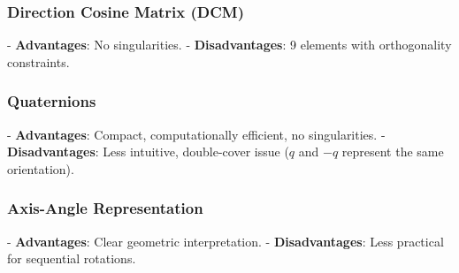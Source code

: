 \documentclass{article}
\begin{document}
\subsubsection{Direction Cosine Matrix (DCM)}
- \textbf{Advantages}: No singularities.
- \textbf{Disadvantages}: 9 elements with orthogonality constraints.

\subsubsection{Quaternions}
- \textbf{Advantages}: Compact, computationally efficient, no singularities.
- \textbf{Disadvantages}: Less intuitive, double-cover issue (\(q\) and \(-q\) represent the same orientation).

\subsubsection{Axis-Angle Representation}
- \textbf{Advantages}: Clear geometric interpretation.
- \textbf{Disadvantages}: Less practical for sequential rotations.
\end{document}
